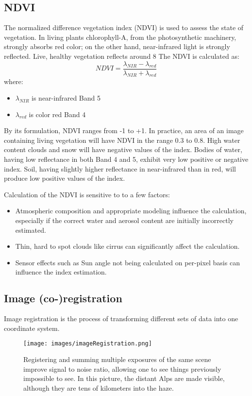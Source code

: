 \subsection{NDVI}
The normalized difference vegetation index (NDVI) is used to assess the state of vegetation. In living plants chlorophyll-A, from the photosynthetic machinery, strongly absorbs red color; on the other hand, near-infrared light is strongly reflected. Live, healthy vegetation reflects around 8%
The NDVI is calculated as:
$$ NDVI = \frac{\lambda_{NIR} - \lambda_{red}}{\lambda_{NIR} + \lambda_{red}} $$
where:
\begin{itemize}
    \item $\lambda_{NIR}$ is near-infrared Band 5
    \item $\lambda_{red}$ is color red Band 4
\end{itemize}
By its formulation, NDVI ranges from -1 to +1. In practice, an area of an image containing living vegetation will have NDVI in the range 0.3 to 0.8. High water content clouds and snow will have negative values of the index. Bodies of water, having low reflectance in both Band 4 and 5, exhibit very low positive or negative index. Soil, having slightly higher reflectance in near-infrared than in red, will produce low positive values of the index.

Calculation of the NDVI is sensitive to to a few factors:
\begin{itemize}
    \item Atmospheric composition and appropriate modeling influence the calculation, especially if the correct water and aerosol content are initially incorrectly estimated.
    \item Thin, hard to spot clouds like cirrus can significantly affect the calculation.
    \item Sensor effects such as Sun angle not being calculated on per-pixel basis can influence the index estimation.
\end{itemize}



\subsection{Image (co-)registration}
Image registration is the process of transforming different sets of data into one coordinate system.

\begin{figure}[H]
    \centering
    \texttt{[image: images/imageRegistration.png]}
    \caption{Registering and summing multiple exposures of the same scene improve signal to noise ratio, allowing one to see things previously impossible to see. In this picture, the distant Alps are made visible, although they are tens of kilometers into the haze.}
  \end{figure}